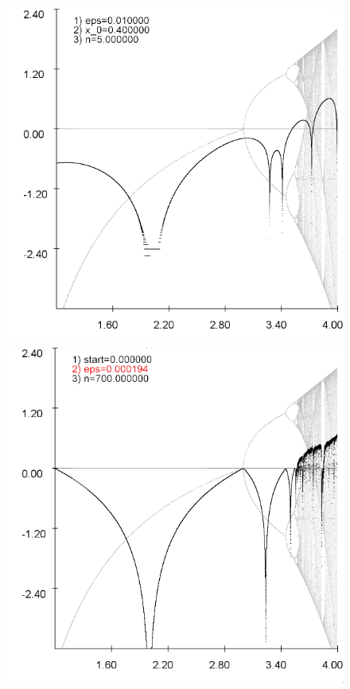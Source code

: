 \documentclass{scrartcl}
\begin{document}
\begin{figure}[!htbp]
\includegraphics[scale=0.28]{iteration/lyapunov-1}
\includegraphics[scale=0.28]{iteration/lyapunov-2}

\end{figure}
\end{document}
